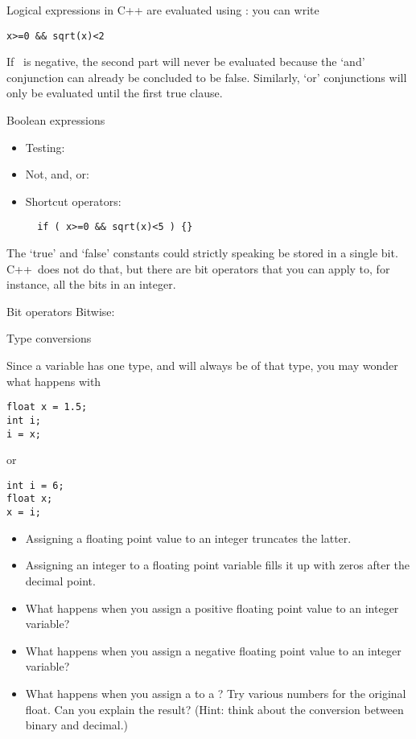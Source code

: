 Logical expressions in C++ are evaluated using
: you can write
\begin{verbatim}
x>=0 && sqrt(x)<2
\end{verbatim}
If ~is negative, the second part will never be evaluated because
the `and' conjunction can already be concluded to be false.
Similarly, `or' conjunctions will only be evaluated until the first
true clause.

\begin{block}{Boolean expressions}
  \label{sl:bool-expr}
  \begin{itemize}
  \item Testing: \n{== != < > <= >=}
  \item Not, and, or:   \n{! && ||}
  \item Shortcut operators:
\begin{verbatim}
  if ( x>=0 && sqrt(x)<5 ) {}
\end{verbatim}
  \end{itemize}
\end{block}

The `true' and `false' constants could strictly speaking be stored in
a single bit. C++~does not do that, but there are bit
operators that you can apply to, for instance, all the bits in an integer.

\begin{block}{Bit operators}
  \label{sl:bit-oper}
 Bitwise: \n{& | ^}
\end{block}

 {Type conversions}

Since a variable has one type, and will always be of that type,
you may wonder what happens with
\begin{verbatim}
float x = 1.5;
int i;
i = x;
\end{verbatim}
or 
\begin{verbatim}
int i = 6;
float x;
x = i;
\end{verbatim}

\begin{itemize}
\item Assigning a floating point value to an integer truncates the
  latter.
\item Assigning an integer to a floating point variable fills it up
  with zeros after the decimal point.
\end{itemize}

\begin{exercise}
  \label{ex:float-convert}
  \begin{itemize}
  \item What happens when you assign a positive floating
    point value to an integer variable?
  \item What happens when you assign a negative floating
    point value to an integer variable?
  \item What happens when you assign a  to a ? 
    Try various numbers for the original float. Can you explain the
    result?
    (Hint: think about the conversion between binary and decimal.)
  \end{itemize}
\end{exercise}

